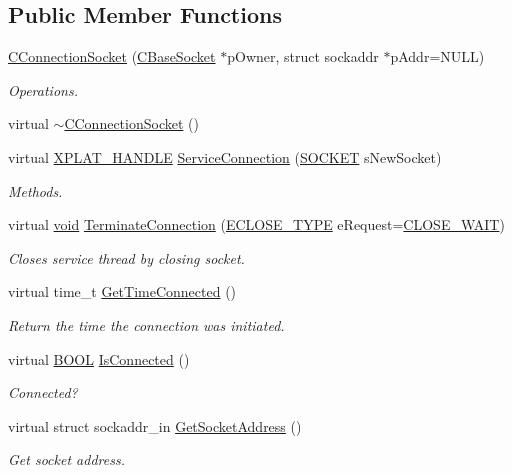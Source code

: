 \subsection*{\-Public \-Member \-Functions}
\begin{DoxyCompactItemize}
\item 
\hyperlink{class_c_connection_socket_a738b33d571cd2a09f6570fb576cf9f3d}{\-C\-Connection\-Socket} (\hyperlink{class_c_base_socket}{\-C\-Base\-Socket} $\ast$p\-Owner, struct sockaddr $\ast$p\-Addr=\-N\-U\-L\-L)
\begin{DoxyCompactList}\small\item\em \-Operations. \end{DoxyCompactList}\item 
virtual \hyperlink{class_c_connection_socket_a4b97f20707d0fc603ce11ba98ebd1615}{$\sim$\-C\-Connection\-Socket} ()
\item 
virtual \hyperlink{_x_plat_8h_af3c5c1485bb09f4be888d78cdaf93e00}{\-X\-P\-L\-A\-T\-\_\-\-H\-A\-N\-D\-L\-E} \hyperlink{class_c_connection_socket_ad28950453ac7b8e7763ebd72210a119d}{\-Service\-Connection} (\hyperlink{_x_plat_8h_a8dc8083897335125630f1af5dafd5831}{\-S\-O\-C\-K\-E\-T} s\-New\-Socket)
\begin{DoxyCompactList}\small\item\em \-Methods. \end{DoxyCompactList}\item 
virtual \hyperlink{_cpclient_8h_a6464f7480a0fd0ee170cba12b2c0497f}{void} \hyperlink{class_c_connection_socket_a3d5b3f4e05c9ccd5fe395b2ac923cada}{\-Terminate\-Connection} (\hyperlink{class_c_connection_socket_a8a17c63c4d0bd7ea0041fbdbd3afc821}{\-E\-C\-L\-O\-S\-E\-\_\-\-T\-Y\-P\-E} e\-Request=\hyperlink{class_c_connection_socket_a8a17c63c4d0bd7ea0041fbdbd3afc821a8a49384dfb9d5d199d06bf076294fa95}{\-C\-L\-O\-S\-E\-\_\-\-W\-A\-I\-T})
\begin{DoxyCompactList}\small\item\em \-Closes service thread by closing socket. \end{DoxyCompactList}\item 
virtual time\-\_\-t \hyperlink{class_c_connection_socket_a6193ee146fc12ed536b0b3cf02038fcc}{\-Get\-Time\-Connected} ()
\begin{DoxyCompactList}\small\item\em \-Return the time the connection was initiated. \end{DoxyCompactList}\item 
virtual \hyperlink{_cpclient_8h_a3be13892ae7076009afcf121347dd319}{\-B\-O\-O\-L} \hyperlink{class_c_connection_socket_a3949c412fdb7b529395cc55a13ee6902}{\-Is\-Connected} ()
\begin{DoxyCompactList}\small\item\em \-Connected? \end{DoxyCompactList}\item 
virtual struct sockaddr\-\_\-in \hyperlink{class_c_connection_socket_abee4469b813b7c4430f22ae166b6613a}{\-Get\-Socket\-Address} ()
\begin{DoxyCompactList}\small\item\em \-Get socket address. \end{DoxyCompactList}\end{DoxyCompactItemize}
